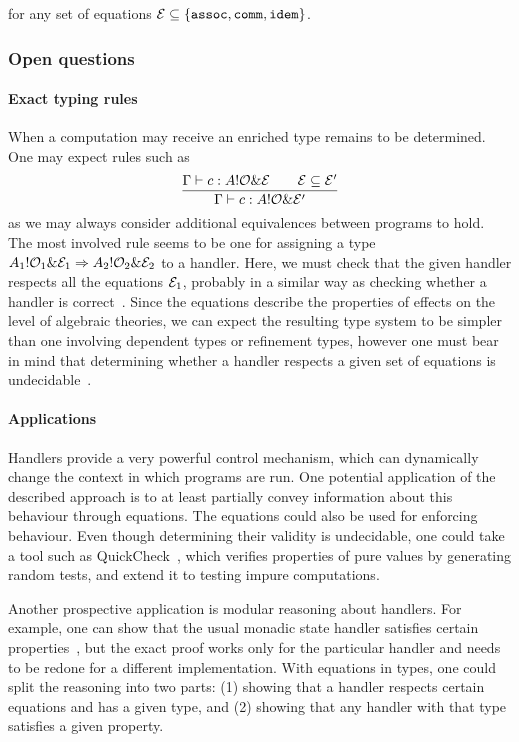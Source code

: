 \documentclass[a4paper,UKenglish]{dagrep}
\begin{document}
\noindent for any set of equations ${\mathcal{E} \subseteq \{ \mathtt{assoc}, \mathtt{comm}, \mathtt{idem} \}}$.

\subsubsection*{Open questions}

\paragraph*{Exact typing rules}
When a computation may receive an enriched type remains to be determined. One may expect rules such as
\[
  \frac{\Gamma \vdash c : A ! \mathcal{O} \& \mathcal{E} \qquad \mathcal{E} \subseteq \mathcal{E}'}{\Gamma \vdash c : A ! \mathcal{O} \& \mathcal{E}'}
\]
as we may always consider additional equivalences between programs to hold. The most involved rule seems to be one for assigning a type $A_1 ! \mathcal{O}_1 \& \mathcal{E}_1 \Rightarrow A_2 ! \mathcal{O}_2 \& \mathcal{E}_2$ to a handler. Here, we must check that the given handler respects all the equations $\mathcal{E}_1$, probably in a similar way as checking whether a handler is correct~\cite{DBLP:journals/corr/PlotkinP13}. Since the equations describe the properties of effects on the level of algebraic theories, we can expect the resulting type system to be simpler than one involving dependent types or refinement types, however one must bear in mind that determining whether a handler respects a given set of equations is undecidable~\cite{DBLP:journals/corr/PlotkinP13}.

\paragraph*{Applications}
Handlers provide a very powerful control mechanism, which can dynamically change the context in which programs are run. One potential application of the described approach is to at least partially convey information about this behaviour through equations. The equations could also be used for enforcing behaviour. Even though determining their validity is undecidable, one could take a tool such as QuickCheck~\cite{DBLP:conf/icfp/ClaessenH00}, which verifies properties of pure values by generating random tests, and extend it to testing impure computations.

Another prospective application is modular reasoning about handlers. For example, one can show that the usual monadic state handler satisfies certain properties~\cite{DBLP:journals/corr/BauerP13}, but the exact proof works only for the particular handler and needs to be redone for a different implementation. With equations in types, one could split the reasoning into two parts: (1) showing that a handler respects certain equations and has a given type, and (2) showing that any handler with that type satisfies a given property.
\end{document}
